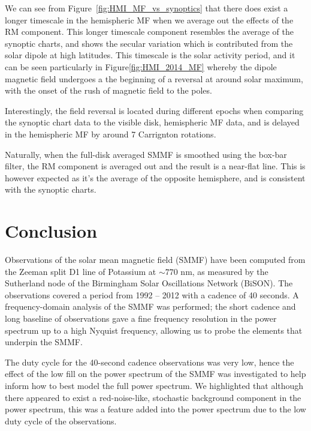 We can see from Figure~\ref{fig:HMI_MF_vs_synoptics} that there does exist a longer timescale in the hemispheric MF when we average out the effects of the RM component. This longer timescale component resembles the average of the synoptic charts, and shows the secular variation which is contributed from the solar dipole at high latitudes. This timescale is the solar activity period, and it can be seen particularly in Figure\ref{fig:HMI_2014_MF} whereby the dipole magnetic field undergoes a the beginning of a reversal at around solar maximum, with the onset of the rush of magnetic field to the poles.

Interestingly, the field reversal is located during different epochs when comparing the synoptic chart data to the visible disk, hemispheric MF data, and is delayed in the hemispheric MF by around 7 Carrignton rotations.

Naturally, when the full-disk averaged SMMF is smoothed using the box-bar filter, the RM component is averaged out and the result is a near-flat line. This is however expected as it's the average of the opposite hemisphere, and is consistent with the synoptic charts.


\section{Conclusion}\label{sec:SMMF_conclusion}


Observations of the solar mean magnetic field (SMMF) have been computed from the Zeeman split D1 line of Potassium at $\sim 770$ nm, as measured by the Sutherland node of the Birmingham Solar Oscillations Network (BiSON). The observations covered a period from 1992 -- 2012 with a cadence of 40 seconds. A frequency-domain analysis of the SMMF was performed; the short cadence and long baseline of observations gave a fine frequency resolution in the power spectrum up to a high Nyquist frequency, allowing us to probe the elements that underpin the SMMF.

The duty cycle for the 40-second cadence observations was very low, hence the effect of the low fill on the power spectrum of the SMMF was investigated to help inform how to best model the full power spectrum. We highlighted that although there appeared to exist a red-noise-like, stochastic background component in the power spectrum, this was a feature added into the power spectrum due to the low duty cycle of the observations.

